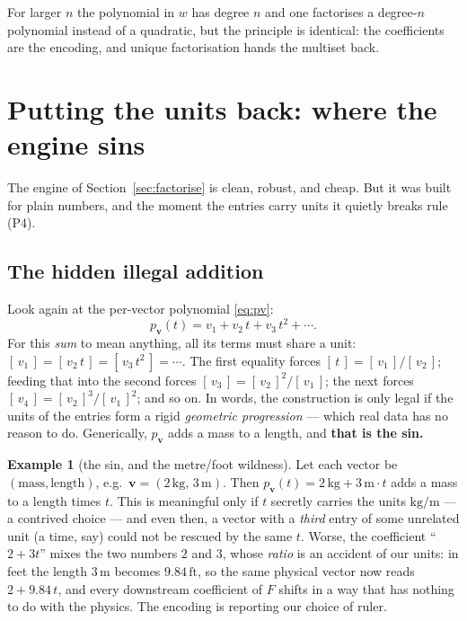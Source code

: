 \documentclass[11pt,a4paper]{article}
\theoremstyle{definition}
\newtheorem{example}[definition]{Example}
\theoremstyle{plain}
\newcommand{\bvec}[1]{\mathbf{#1}}
\newcommand{\units}[1]{[\,#1\,]}   %
\begin{document}
\noindent
For larger $n$ the polynomial in $w$ has degree $n$ and one factorises a degree-$n$
polynomial instead of a quadratic, but the principle is identical: the coefficients
are the encoding, and unique factorisation hands the multiset back.

\section{Putting the units back: where the engine sins}
\label{sec:sin}

The engine of Section~\ref{sec:factorise} is clean, robust, and cheap. But it was
built for plain numbers, and the moment the entries carry units it quietly breaks
rule (P4).

\subsection{The hidden illegal addition}

Look again at the per-vector polynomial \eqref{eq:pv}:
\[
   p_{\bvec v}(t)=v_1+v_2\,t+v_3\,t^2+\cdots .
\]
For this \emph{sum} to mean anything, all its terms must share a unit:
$\units{v_1}=\units{v_2\,t}=\units{v_3\,t^2}=\cdots$. The first equality forces
$\units{t}=\units{v_1}/\units{v_2}$; feeding that into the second forces
$\units{v_3}=\units{v_2}^2/\units{v_1}$; the next forces
$\units{v_4}=\units{v_2}^3/\units{v_1}^2$; and so on. In words, the construction is
only legal if the units of the entries form a rigid \emph{geometric progression}
--- which real data has no reason to do. Generically, $p_{\bvec v}$ adds a mass to a
length, and \textbf{that is the sin.}

\begin{example}[the sin, and the metre/foot wildness]\label{ex:sin}
Let each vector be $(\text{mass},\text{length})$, e.g.\ $\bvec v=(2\,\mathrm{kg},\,
3\,\mathrm{m})$. Then $p_{\bvec v}(t)=2\,\mathrm{kg}+3\,\mathrm{m}\cdot t$ adds a
mass to a length times $t$. This is meaningful only if $t$ secretly carries the
units $\mathrm{kg}/\mathrm{m}$ --- a contrived choice --- and even then, a vector
with a \emph{third} entry of some unrelated unit (a time, say) could not be
rescued by the same $t$. Worse, the coefficient ``$2+3t$'' mixes the two numbers
$2$ and $3$, whose \emph{ratio} is an accident of our units: in feet the length
$3\,\mathrm{m}$ becomes $9.84\,\mathrm{ft}$, so the same physical vector now reads
$2+9.84\,t$, and every downstream coefficient of $F$ shifts in a way that has
nothing to do with the physics. The encoding is reporting our choice of ruler.
\end{example}
\end{document}
